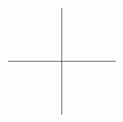 \documentclass{amsart}
\providecommand{\extrarowheight}{\dimen0 }
\begin{document}

\begin{equation*}
\renewcommand{\arraystretch}{1} \setlength{\unitlength}{1.0pt} \setlength{\extrarowheight}{0.0pt}\begin{tikzpicture}[baseline=0pt]
\draw(-1.5,0) -- (1.5,0);
\draw(0,-1.5) -- (0,1.5);
\end{tikzpicture}
\end{equation*}
\end{document}
